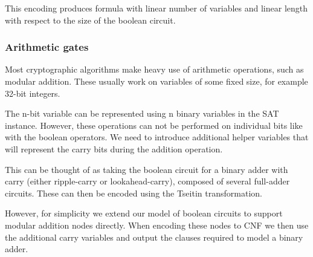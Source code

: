 This encoding produces formula with linear number of variables and linear length with respect to the size of the boolean circuit.

\subsubsection{Arithmetic gates}
Most cryptographic algorithms make heavy use of arithmetic operations, such as modular addition.
These usually work on variables of some fixed size, for example 32-bit integers.

The n-bit variable can be represented using n binary variables in the SAT instance.
However, these operations can not be performed on individual bits like with the boolean operators.
We need to introduce additional helper variables that will represent the carry bits during the addition operation.

This can be thought of as taking the boolean circuit for a binary adder with carry (either ripple-carry or lookahead-carry), composed of several full-adder circuits.
These can then be encoded using the Tseitin transformation.

However, for simplicity we extend our model of boolean circuits to support modular addition nodes directly.
When encoding these nodes to CNF we then use the additional carry variables and output the clauses required to model a binary adder.


%
%
% 
